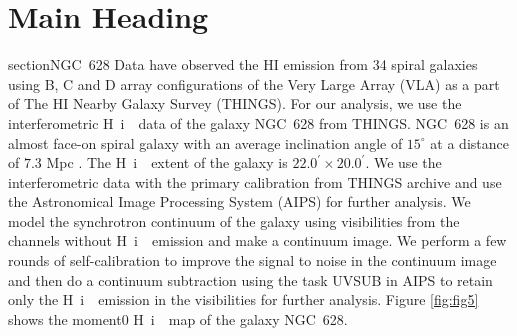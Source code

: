 \documentclass{article}
\def\HI{H~{\sc i}~}
\begin{document}
\section{Main Heading}
section{NGC~628 Data}
\label{data}
\citet{walter08} have observed the HI emission from 34 spiral galaxies
using B, C and D array configurations of the Very Large Array (VLA) as
a part of The HI Nearby Galaxy Survey (THINGS). For our analysis, we
use the interferometric \HI ~data of the galaxy NGC~628 from
THINGS. NGC~628 is an almost face-on spiral galaxy with an average
inclination angle of $15^{\circ}$ at a distance of $7.3$ Mpc
\citep{deblok08}. The \HI~extent of the galaxy is $22.0^{'} \times
20.0^{'}$. We use the interferometric data with the primary
calibration from THINGS archive and use the Astronomical Image
Processing System (AIPS) for further analysis. We model the
synchrotron continuum of the galaxy using visibilities from the
channels without \HI~emission and make a continuum image. We perform a
few rounds of self-calibration to improve the signal to noise in the
continuum image and then do a continuum subtraction using the task
UVSUB in AIPS to retain only the \HI~emission in the visibilities for
further analysis. Figure \ref {fig:fig5} shows the moment0 \HI~map of
the galaxy NGC~628.
\end{document}
